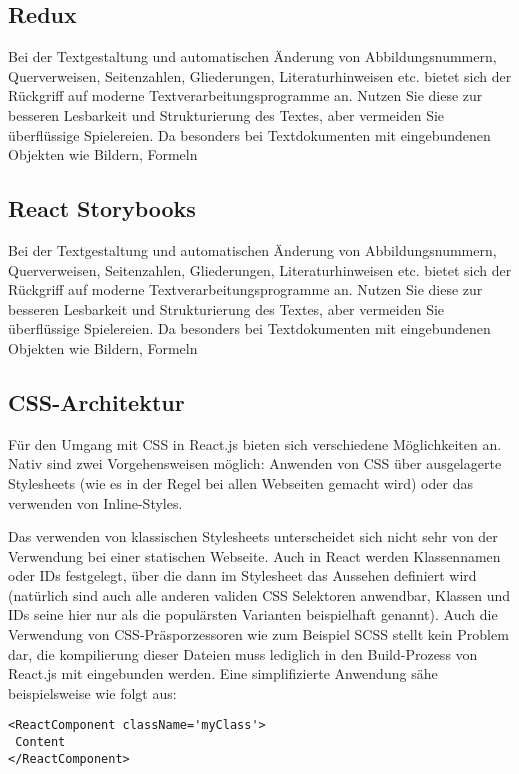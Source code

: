 \subsection{Redux}
Bei der Textgestaltung und automatischen Änderung von Abbildungsnummern, Querverweisen,
Seitenzahlen, Gliederungen, Literaturhinweisen etc. bietet sich der Rückgriff
auf moderne Textverarbeitungsprogramme an. Nutzen Sie diese zur besseren Lesbarkeit
und Strukturierung des Textes, aber vermeiden Sie überflüssige Spielereien. Da
besonders bei Textdokumenten mit eingebundenen Objekten wie Bildern, Formeln

\subsection{React Storybooks}
Bei der Textgestaltung und automatischen Änderung von Abbildungsnummern, Querverweisen,
Seitenzahlen, Gliederungen, Literaturhinweisen etc. bietet sich der Rückgriff
auf moderne Textverarbeitungsprogramme an. Nutzen Sie diese zur besseren Lesbarkeit
und Strukturierung des Textes, aber vermeiden Sie überflüssige Spielereien. Da
besonders bei Textdokumenten mit eingebundenen Objekten wie Bildern, Formeln

\subsection{CSS-Architektur}
Für den Umgang mit CSS in React.js bieten sich verschiedene Möglichkeiten an. Nativ sind zwei Vorgehensweisen möglich: Anwenden von CSS über ausgelagerte Stylesheets (wie es in der Regel bei allen Webseiten gemacht wird) oder das verwenden von Inline-Styles.

Das verwenden von klassischen Stylesheets unterscheidet sich nicht sehr von der Verwendung bei einer statischen Webseite. Auch in React werden Klassennamen oder IDs festgelegt, über die dann im Stylesheet das Aussehen definiert wird (natürlich sind auch alle anderen validen CSS Selektoren anwendbar, Klassen und IDs seine hier nur als die populärsten Varianten beispielhaft genannt).
Auch die Verwendung von CSS-Präsporzessoren wie zum Beispiel SCSS stellt kein Problem dar, die kompilierung dieser Dateien muss lediglich in den Build-Prozess von React.js mit eingebunden werden. Eine simplifizierte Anwendung sähe beispielsweise wie folgt aus:

\begin{lstlisting}
<ReactComponent className='myClass'>
 Content
</ReactComponent>
\end{lstlisting}

